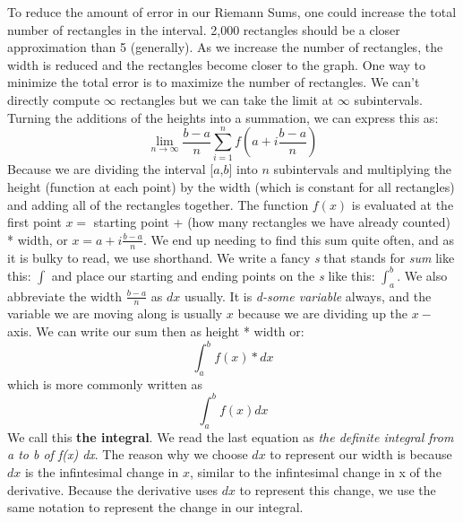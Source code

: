 \documentclass[../revisedmain.tex]{subfiles}
\begin{document}
To reduce the amount of error in our Riemann Sums, one could increase the total number of rectangles in the interval. 2,000 rectangles should be a closer approximation than 5 (generally). As we increase the number of rectangles, the width is reduced and the rectangles become closer to the graph. One way to minimize the total error is to maximize the number of rectangles. We can't directly compute $\infty$ rectangles but we can take the limit at $\infty$ subintervals. Turning the additions of the heights into a summation, we can express this as:$$\lim_{n\to\infty}\frac{b-a}{n}\sum_{i=1}^{n} f\left(a+i\frac{b-a}{n}\right) $$ Because we are dividing the interval [$a$,$b$] into $n$ subintervals and multiplying the height (function at each point) by the width (which is constant for all rectangles) and adding all of the rectangles together. The function $f(x)$ is evaluated at the first point $x=$ starting point + (how many rectangles we have already counted) * width, or $x=a+i\displaystyle\frac{b-a}{n}$. We end up needing to find this sum quite often, and as it is bulky to read, we use shorthand. We write a fancy \textit{s} that stands for \textit{sum} like this: $\int$ and place our starting and ending points on the \textit{s} like this: $\displaystyle\int_{a}^{b}$. We also abbreviate the width $\displaystyle\frac{b-a}{n}$ as $dx$ usually. It is \textit{d-some variable} always, and the variable we are moving along is usually $x$ because we are dividing up the $x-$axis. We can write our sum then as height * width or: $$\int_{a}^{b} f(x)*dx$$which is more commonly written as $$\int_{a}^{b}f(x)dx$$ We call this \textbf{the integral}. We read the last equation as \textit{the definite integral from a to b of f(x) dx}. The reason why we choose $dx$ to represent our width is because $dx$ is the infintesimal change in $x$, similar to the infintesimal change in x of the derivative. Because the derivative uses $dx$ to represent this change, we use the same notation to represent the change in our integral.
\end{document}
